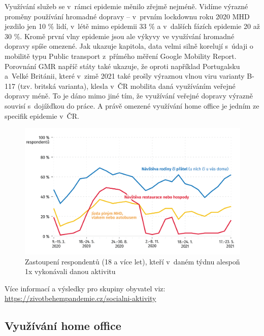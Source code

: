 Využívání služeb se v rámci epidemie měnilo zřejmě nejméně. Vidíme výrazné proměny používání hromadné dopravy – v prvním lockdownu roku 2020 MHD jezdilo jen 10 \% lidí, v létě mimo epidemii 33 \% a v dalších fázích epidemie 20 až 30 \%. Kromě první vlny epidemie jsou ale výkyvy ve využívání hromadné dopravy spíše omezené. Jak ukazuje kapitola, data velmi silně korelují s údaji o mobilitě typu Public transport z přímého měření Google Mobility Report. Porovnání GMR napříč státy také ukazuje, že oproti například Portugalsku a Velké Británii, které v zimě 2021 také prošly výraznou vlnou viru varianty B-117 (tzv. britská varianta), klesla v ČR mobilita daná využíváním veřejné dopravy méně. To je dáno mimo jiné tím, že využívání veřejné dopravy výrazně souvisí s dojížďkou do práce. A právě omezené využívání home office je jedním ze specifik epidemie v ČR.

\begin{figure}[ht]
    \centering
    \includegraphics[width=\textwidth]{./pic/zbp-graf3.png}
    \caption{Zastoupení respondentů (18 a více let), kteří v daném týdnu alespoň 1x vykonávali danou aktivitu}
    \label{fig:zbp3}
\end{figure}


Více informací a výsledky pro skupiny obyvatel viz: \url{https://zivotbehempandemie.cz/socialni-aktivity}


\subsection*{Využívání home office}

